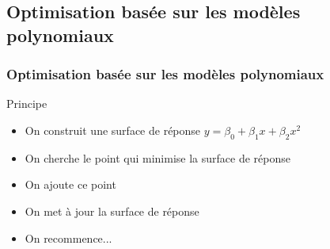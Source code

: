 \subsection{Optimisation basée sur les modèles polynomiaux}
\begin{frame}
\frametitle{Optimisation basée sur les modèles polynomiaux}
\begin{block}{Principe}
 \begin{itemize}
  \item On construit une surface de réponse $y = \beta_0 + \beta_1 x + \beta_2 x^2$
  \item On cherche le point qui minimise la surface de réponse
  \item On ajoute ce point
  \item On met à jour la surface de réponse
  \item On recommence...
 \end{itemize}
\end{block}


\end{frame}
